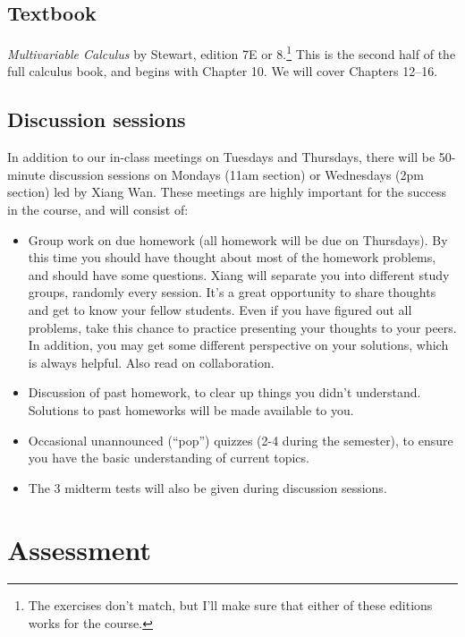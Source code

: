 \documentclass[oneside,11pt]{amsart}
\begin{document}

\subsection{Textbook}

\emph{Multivariable Calculus} by Stewart, edition 7E or 8.\footnote{The exercises don't match, but I'll make sure that either of these editions works for the course.} This is the second half of the full calculus book, and begins with Chapter 10. We will cover Chapters 12--16.

\subsection{Discussion sessions} 

In addition to our in-class meetings on Tuesdays and Thursdays, there will be 50-minute discussion sessions on Mondays (11am section) or Wednesdays (2pm section) led by Xiang Wan. These meetings are highly important for the success in the course, and will consist of:
\begin{itemize}
	\item 
	Group work on due homework (all homework will be due on Thursdays). By this time you should have thought about most of the homework problems, and should have some questions. Xiang will separate you into different study groups, randomly every session. It’s a great opportunity to share thoughts and get to know your fellow students. Even if you have figured out all problems, take this chance to practice presenting your thoughts to your peers. In addition, you may get some different perspective on your solutions, which is always helpful. Also read  on collaboration.
	\item 
	Discussion of past homework, to clear up things you didn't understand. Solutions to past homeworks will be made available to you.
	\item Occasional unannounced (``pop'') quizzes (2-4 during the semester), to ensure you have the basic understanding of current topics.
	\item The 3 midterm tests will also be given during discussion sessions.
\end{itemize}

\section{Assessment}
\end{document}
